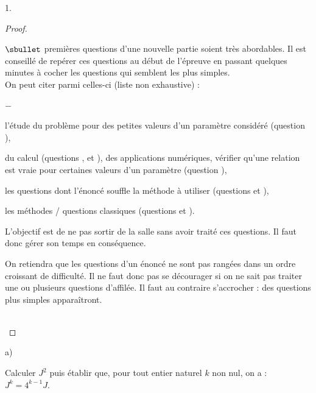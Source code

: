 \documentclass[11pt]{article}%
\begin{document}
\begin{noliste}{1.}
\begin{proof}
\begin{remark}
\begin{noliste}{$\sbullet$}
        premières questions d'une nouvelle partie soient très
        abordables. Il est conseillé de repérer ces questions au début
        de l'épreuve en passant quelques minutes à cocher les
        questions qui semblent les plus simples.\\
        On peut citer parmi celles-ci (liste non exhaustive) :
        \begin{noliste}{$-$}
        \item l'étude du problème pour des petites valeurs d'un
          paramètre considéré (question ),
        \item du calcul (questions ,  et
          ), des applications numériques, vérifier qu'une
          relation est vraie pour certaines valeurs d'un paramètre
          (question ),
        \item les questions dont l'énoncé souffle la méthode à
          utiliser (questions  et ),
        \item les méthodes / questions classiques (questions
           et ).
        \end{noliste}
        L'objectif est de ne pas sortir de la salle sans avoir traité
        ces questions. Il faut donc gérer son temps en conséquence.
      \item On retiendra que les questions d'un énoncé ne sont pas
        rangées dans un ordre croissant de difficulté. Il ne faut donc
        pas se décourager si on ne sait pas traiter une ou plusieurs
        questions d'affilée. Il faut au contraire s'accrocher : des
        questions plus simples apparaîtront.
      \end{noliste}
    \end{remark}~\\[-1.2cm]
  \end{proof}

\item
  \begin{noliste}{a)}
    \setlength{\itemsep}{2mm}
  \item Calculer $J^{2}$ puis établir que, pour tout entier naturel
    $k$ non nul, on a : $J^{k} = 4^{k-1} J$.


\end{noliste}
\end{noliste}
\end{document}
